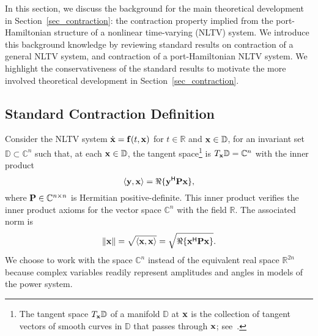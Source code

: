 In this section, we discuss the background for the main theoretical development in Section~\ref{sec_contraction}: the contraction property implied from the port-Hamiltonian structure of a nonlinear time-varying (NLTV) system. We introduce this background knowledge by reviewing standard results on contraction of a general NLTV system, and contraction of a port-Hamiltonian NLTV system. We highlight the conservativeness of the standard results to motivate the more involved theoretical development in Section~\ref{sec_contraction}.

\subsection{Standard Contraction Definition}
Consider the NLTV system $\dot{\mathbf{x}} = \mathbf{f}(t, \mathbf{x})$ for $t \in \mathbb{R}$ and $\mathbf{x} \in \mathbb{D}$, for an invariant set $\mathbb{D} \subset \mathbb{C}^n$ such that, at each $\mathbf{x} \in \mathbb{D}$, the tangent space\footnote{The tangent space $T_{\mathbf{x}} \mathbb{D}$ of a manifold $\mathbb{D}$ at $\mathbf{x}$ is the collection of tangent vectors of smooth curves in $\mathbb{D}$ that passes through $\mathbf{x}$; see~\cite[Def.~3.33]{FB-ADL:04}.} is $T_{\mathbf{x}} \mathbb{D} = \mathbb{C}^n$ with the inner product 
\begin{equation} \label{E:inner_product}
    \langle \mathbf{y}, \mathbf{x} \rangle = \Re\{\mathbf{y}^{\mathsf{H}} \mathbf{P} \mathbf{x}\},
\end{equation}
where $\mathbf{P} \in \mathbb{C}^{n\times n}$ is Hermitian positive-definite. This inner product verifies the inner product axioms for the vector space $\mathbb{C}^n$ with the field $\mathbb{R}$. The associated norm is
\begin{equation*}
    \|\mathbf{x}\| = \sqrt{\langle \mathbf{x}, \mathbf{x} \rangle} = \sqrt{\Re\{\mathbf{x}^{\mathsf{H}} \mathbf{P} \mathbf{x}\}}.
\end{equation*}
We choose to work with the space $\mathbb{C}^n$ instead of the equivalent real space $\mathbb{R}^{2n}$ because complex variables readily represent amplitudes and angles in models of the power system. 


